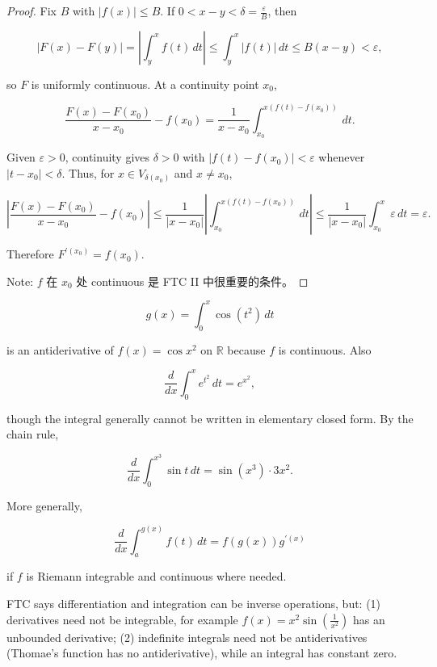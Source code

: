 \begin{proof}

Fix \(B\) with \(\left| {f(x)} \right| \leq B\). If \(0 < x - y < \delta = \frac{\varepsilon}{B}\), then

\[\left| {F(x) - F(y)} \right| = \left| {\int_{y}^{x}f(t)\, dt} \right| \leq \int_{y}^{x}\left| {f(t)} \right|\, dt \leq B\left( {x - y} \right) < \varepsilon,\]

so \(F\) is uniformly continuous. At a continuity point \(x_{0}\),

\[\frac{F(x) - F\left( x_{0} \right)}{x - x_{0}} - f\left( x_{0} \right) = \frac{1}{x - x_{0}}\int_{x_{0}}^{x{({f{(t)} - f{(x_{0})}})}}\, dt.\]

Given \(\varepsilon > 0\), continuity gives \(\delta > 0\) with \(\left| {f(t) - f\left( x_{0} \right)} \right| < \varepsilon\) whenever \(\left| {t - x_{0}} \right| < \delta\). Thus, for \(x \in V_{\delta{(x_{0})}}\) and \(x \neq x_{0}\),

\[\left| {\frac{F(x) - F\left( x_{0} \right)}{x - x_{0}} - f\left( x_{0} \right)} \right| \leq \frac{1}{\left| {x - x_{0}} \right|}\left| {\int_{x_{0}}^{x{({f{(t)} - f{(x_{0})}})}}\, dt} \right| \leq \frac{1}{\left| {x - x_{0}} \right|}\int_{x_{0}}^{x}\varepsilon\, dt = \varepsilon.\]

Therefore \(F^{'{(x_{0})}} = f\left( x_{0} \right)\).

Note: \(f\) 在 \(x_{0}\) 处 continuous 是 FTC II 中很重要的条件。

\end{proof}

\begin{example}

\[g(x) = \int_{0}^{x}\cos\left( t^{2} \right)\, dt\]

is an antiderivative of \(f(x) = \cos x^{2}\) on \(\mathbb{R}\) because \(f\) is continuous. Also

\[\frac{d}{dx}\int_{0}^{x}e^{t^{2}}\, dt = e^{x^{2}},\]

though the integral generally cannot be written in elementary closed form. By the chain rule,

\[\frac{d}{dx}\int_{0}^{x^{3}}\sin t\, dt = \sin\left( x^{3} \right) \cdot 3x^{2}.\]

More generally,

\[\frac{d}{dx}\int_{a}^{g{(x)}}f(t)\, dt = f\left( {g(x)} \right)g^{'{(x)}}\]

if \(f\) is Riemann integrable and continuous where needed.

FTC says differentiation and integration can be inverse operations, but: (1) derivatives need not be integrable, for example \(f(x) = x^{2}\sin\left( \frac{1}{x^{2}} \right)\) has an unbounded derivative; (2) indefinite integrals need not be antiderivatives (Thomae's function has no antiderivative), while an integral has constant zero.

\end{example}

